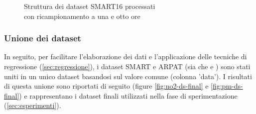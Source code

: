 \begin{figure}[H]%
    \centering
    \captionsetup{justification=centering}
    \caption{Struttura dei dataset SMART16 processati\\con ricampionamento a una e otto ore}%
    \label{fig:arpat-pm}%
\end{figure}

\subsubsection{Unione dei dataset}
In seguito, per facilitare l'elaborazione dei dati e l'applicazione delle tecniche di regressione (\ref{sec:regressione}), i dataset SMART e ARPAT (sia  che  e ) sono stati uniti in un unico dataset basandosi sul valore comune (colonna 'data').
I risultati di questa unione sono riportati di seguito (figure \ref{fig:no2-ds-final} e \ref{fig:pm-ds-final}) e rappresentano i dataset finali utilizzati nella fase di sperimentazione (\ref{sec:esperimenti}).

